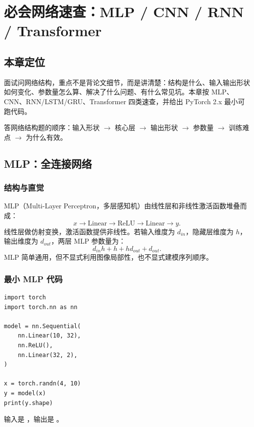 \chapter{必会网络速查：MLP / CNN / RNN / Transformer}

\section{本章定位}

面试问网络结构，重点不是背论文细节，而是讲清楚：结构是什么、输入输出形状如何变化、参数量怎么算、解决了什么问题、有什么常见坑。本章按 MLP、CNN、RNN/LSTM/GRU、Transformer 四类速查，并给出 PyTorch 2.x 最小可跑代码。

\begin{quickcard}
答网络结构题的顺序：输入形状 \(\rightarrow\) 核心层 \(\rightarrow\) 输出形状 \(\rightarrow\) 参数量 \(\rightarrow\) 训练难点 \(\rightarrow\) 为什么有效。
\end{quickcard}

\section{MLP：全连接网络}

\subsection{结构与直觉}

MLP（Multi-Layer Perceptron，多层感知机）由线性层和非线性激活函数堆叠而成：
\[
x \rightarrow \mathrm{Linear} \rightarrow \mathrm{ReLU} \rightarrow \mathrm{Linear} \rightarrow y.
\]
线性层做仿射变换，激活函数提供非线性。若输入维度为 \(d_{in}\)，隐藏层维度为 \(h\)，输出维度为 \(d_{out}\)，两层 MLP 参数量为：
\[
d_{in}h+h+hd_{out}+d_{out}.
\]
MLP 简单通用，但不显式利用图像局部性，也不显式建模序列顺序。

\subsection{最小 MLP 代码}

\begin{lstlisting}
import torch
import torch.nn as nn

model = nn.Sequential(
    nn.Linear(10, 32),
    nn.ReLU(),
    nn.Linear(32, 2),
)

x = torch.randn(4, 10)
y = model(x)
print(y.shape)
\end{lstlisting}

输入是 ，输出是 \code{[4, 2]}。

